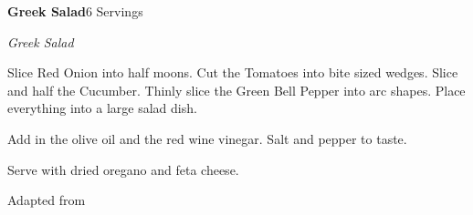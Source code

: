 \documentclass[../recipe-collections/cooking.tex]{subfiles}
\begin{document}
\begin{recipe}{\textbf{Greek Salad}}{6 Servings}{}
  
  \freeform{}\textit{Greek Salad}


  Slice Red Onion into half moons. Cut the Tomatoes into bite sized wedges. Slice and
  half the Cucumber. Thinly slice the Green Bell Pepper into arc shapes. Place everything
  into a large salad dish.


  Add in the olive oil and the  red wine vinegar. Salt and pepper to taste.

  
  Serve with dried oregano and feta cheese.

  
  \freeform{}\hrulefill{}

\end{recipe}

Adapted from  \autocite{suzy_karadsheh_2021}
\end{document}
